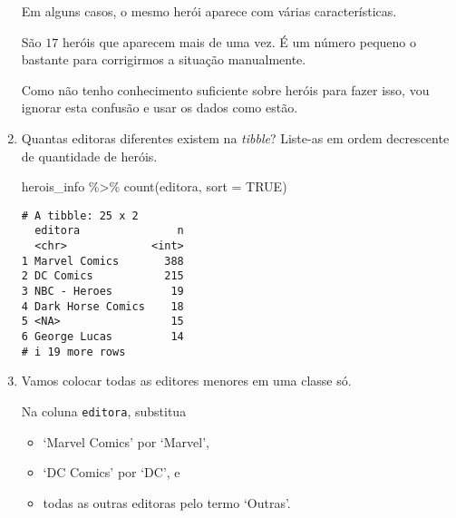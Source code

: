 \documentclass[
  letterpaper,
  DIV=11,
  numbers=noendperiod]{scrreprt}
\newenvironment{Shaded}{\begin{snugshade}}{\end{snugshade}}
\newcommand{\AttributeTok}[1]{\textcolor[rgb]{0.40,0.45,0.13}{#1}}
\newcommand{\ConstantTok}[1]{\textcolor[rgb]{0.56,0.35,0.01}{#1}}
\newcommand{\FunctionTok}[1]{\textcolor[rgb]{0.28,0.35,0.67}{#1}}
\newcommand{\NormalTok}[1]{\textcolor[rgb]{0.00,0.23,0.31}{#1}}
\newcommand{\SpecialCharTok}[1]{\textcolor[rgb]{0.37,0.37,0.37}{#1}}
\providecommand{\tightlist}{%
  \setlength{\itemsep}{0pt}\setlength{\parskip}{0pt}}\usepackage{longtable,booktabs,array}
\begin{document}
\begin{enumerate}
\begin{tcolorbox}
  Em alguns casos, o mesmo herói aparece com várias características.

  São $17$ heróis que aparecem mais de uma vez. É um número pequeno o
  bastante para corrigirmos a situação manualmente.

  Como não tenho conhecimento suficiente sobre heróis para fazer isso,
  vou ignorar esta confusão e usar os dados como estão.

  \end{tcolorbox}
\item
  Quantas editoras diferentes existem na \emph{tibble}? Liste-as em
  ordem decrescente de quantidade de heróis.

  \begin{tcolorbox}[enhanced jigsaw, coltitle=black, colbacktitle=quarto-callout-tip-color!10!white, title=\textcolor{quarto-callout-tip-color}{\faLightbulb}\hspace{0.5em}{Resposta}, toprule=.15mm, leftrule=.75mm, opacityback=0, colback=white, arc=.35mm, breakable, bottomtitle=1mm, left=2mm, toptitle=1mm, titlerule=0mm, rightrule=.15mm, bottomrule=.15mm, opacitybacktitle=0.6, colframe=quarto-callout-tip-color-frame]

\begin{Shaded}
\begin{Highlighting}[]
\NormalTok{herois\_info }\SpecialCharTok{\%\textgreater{}\%} \FunctionTok{count}\NormalTok{(editora, }\AttributeTok{sort =} \ConstantTok{TRUE}\NormalTok{)}
\end{Highlighting}
\end{Shaded}

\begin{verbatim}
# A tibble: 25 x 2
  editora               n
  <chr>             <int>
1 Marvel Comics       388
2 DC Comics           215
3 NBC - Heroes         19
4 Dark Horse Comics    18
5 <NA>                 15
6 George Lucas         14
# i 19 more rows
\end{verbatim}

  \end{tcolorbox}
\item
  Vamos colocar todas as editores menores em uma classe só.

  Na coluna \texttt{editora}, substitua

  \begin{itemize}
  \tightlist
  \item
    `Marvel Comics' por `Marvel',
  \item
    `DC Comics' por `DC', e
  \item
    todas as outras editoras pelo termo `Outras'.
  \end{itemize}


\end{enumerate}
\end{document}
